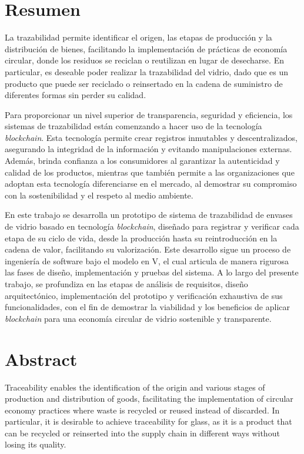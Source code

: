 \thispagestyle{plain}
\chapter*{Resumen}

La trazabilidad permite identificar el origen, las etapas de producción y la distribución de bienes, facilitando la implementación de prácticas de economía circular, donde los residuos se reciclan o reutilizan en lugar de desecharse. En particular, es deseable poder realizar la trazabilidad del vidrio, dado que es un producto que puede ser reciclado o reinsertado en la cadena de suministro de diferentes formas sin perder su calidad.

Para proporcionar un nivel superior de transparencia, seguridad y eficiencia, los sistemas de trazabilidad están comenzando a hacer uso de la tecnología \textit{blockchain}. Esta tecnología permite crear registros inmutables y descentralizados, asegurando la integridad de la información y evitando manipulaciones externas. Además, brinda confianza a los consumidores al garantizar la autenticidad y calidad de los productos, mientras que también permite a las organizaciones que adoptan esta tecnología diferenciarse en el mercado, al demostrar su compromiso con la sostenibilidad y el respeto al medio ambiente.

En este trabajo se desarrolla un prototipo de sistema de trazabilidad de envases de vidrio basado en tecnología \textit{blockchain}, diseñado para registrar y verificar cada etapa de su ciclo de vida, desde la producción hasta su reintroducción en la cadena de valor, facilitando su valorización. Este desarrollo sigue un proceso de ingeniería de software bajo el modelo en V, el cual articula de manera rigurosa las fases de diseño, implementación y pruebas del sistema. A lo largo del presente trabajo, se profundiza en las etapas de análisis de requisitos, diseño arquitectónico, implementación del prototipo y verificación exhaustiva de sus funcionalidades, con el fin de demostrar la viabilidad y los beneficios de aplicar \textit{blockchain} para una economía circular de vidrio sostenible y transparente.

\chapter*{Abstract}

Traceability enables the identification of the origin and various stages of production and distribution of goods, facilitating the implementation of circular economy practices where waste is recycled or reused instead of discarded. In particular, it is desirable to achieve traceability for glass, as it is a product that can be recycled or reinserted into the supply chain in different ways without losing its quality.


